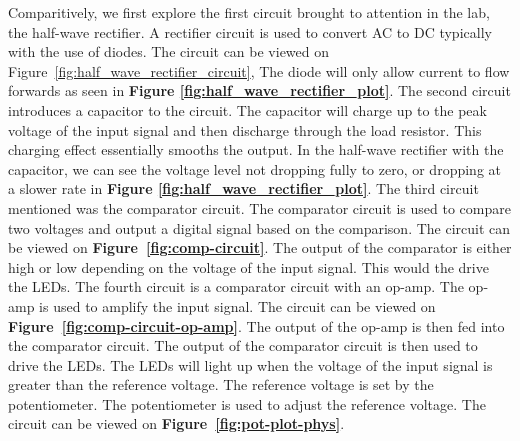 \documentclass{article}
\begin{document}
Comparitively, we first explore the first circuit brought to attention in the lab, the half-wave rectifier. A rectifier circuit is used to convert AC to DC typically with the use of diodes.
The circuit can be viewed on Figure~\ref{fig:half_wave_rectifier_circuit}, The diode will only allow current to flow forwards as seen in \textbf{Figure \ref{fig:half_wave_rectifier_plot}}. The second circuit introduces a capacitor to the circuit. The capacitor will charge up to the peak voltage of the input signal and then discharge through the load resistor. This charging effect essentially smooths the output. In the half-wave rectifier with the capacitor, we can see the voltage level not dropping fully to zero, or dropping at a slower rate in \textbf{Figure \ref{fig:half_wave_rectifier_plot}}.
The third circuit mentioned was the comparator circuit. The comparator circuit is used to compare two voltages and output a digital signal based on the comparison. The circuit can be viewed on \textbf{Figure~\ref{fig:comp-circuit}}. The output of the comparator is either high or low depending on the voltage of the input signal. This would the drive the LEDs.
The fourth circuit is a comparator circuit with an op-amp. The op-amp is used to amplify the input signal. The circuit can be viewed on \textbf{Figure~\ref{fig:comp-circuit-op-amp}}. The output of the op-amp is then fed into the comparator circuit. The output of the comparator circuit is then used to drive the LEDs. The LEDs will light up when the voltage of the input signal is greater than the reference voltage. The reference voltage is set by the potentiometer. The potentiometer is used to adjust the reference voltage. The circuit can be viewed on \textbf{Figure~\ref{fig:pot-plot-phys}}.
\end{document}
